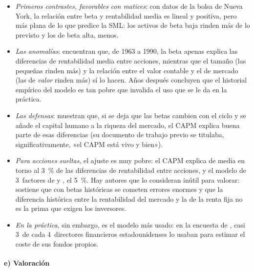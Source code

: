 \documentclass[11pt]{article}
\begin{document}
\begin{itemize}
\item \emph{Primeros contrastes, favorables con matices}: con datos de la bolsa de Nueva York, la relación entre beta y rentabilidad media es lineal y positiva, pero más plana de lo que predice la SML: los activos de beta baja rinden más de lo previsto y los de beta alta, menos\nocite{BlackJensenScholes1972Capital,FamaMacBeth1973Risk}.
\item \emph{Las anomalías}: \textcite{FamaFrench1992} encuentran que, de 1963 a 1990, la beta apenas explica las diferencias de rentabilidad media entre acciones, mientras que el tamaño (las pequeñas rinden más) y la relación entre el valor contable y el de mercado (las de \emph{valor} rinden más) sí lo hacen. Años después concluyen que el historial empírico del modelo es tan pobre que invalida el uso que se le da en la práctica\nocite{FamaFrench2004CAPM}.
\item \emph{Las defensas}: \textcite{JagannathanWang1996} muestran que, si se deja que las betas cambien con el ciclo y se añade el capital humano a la riqueza del mercado, el CAPM explica buena parte de esas diferencias (su documento de trabajo previo se titulaba, significativamente, «el CAPM está vivo y bien»).
\item \emph{Para acciones sueltas}, el ajuste es muy pobre: el CAPM explica de media en torno al 3~\% de las diferencias de rentabilidad entre acciones, y el modelo de 3~factores de  y , el 5~\%\nocite{BartholdyPeare2005}. Hay autores que lo consideran inútil para valorar: \textcite{Fernandez2015CAPM} sostiene que con betas históricas se cometen errores enormes y que la diferencia histórica entre la rentabilidad del mercado y la de la renta fija no es la prima que exigen los inversores.
\item \emph{En la práctica}, sin embargo, es el modelo más usado: en la encuesta de \textcite{GrahamHarvey2001Theory}, casi 3~de cada 4~directores financieros estadounidenses lo usaban para estimar el coste de sus fondos propios.
\end{itemize}

\paragraph{e) Valoración}
\end{document}
